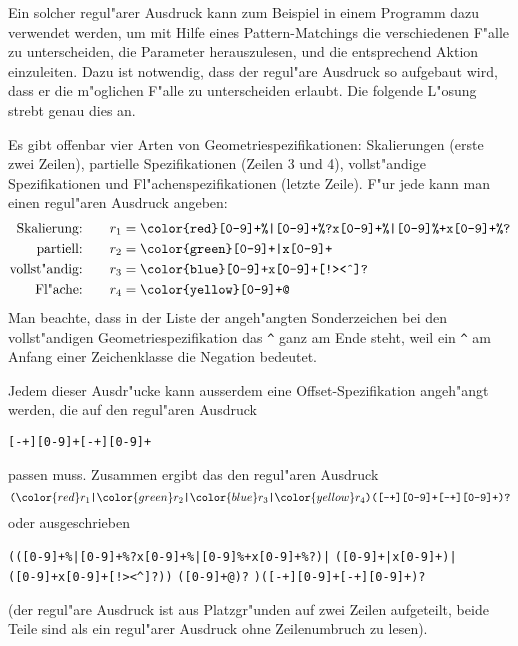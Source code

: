 \begin{loesung}
Ein solcher regul"arer Ausdruck kann zum Beispiel in einem Programm dazu
verwendet werden, um mit Hilfe eines Pattern-Matchings die verschiedenen
F"alle zu unterscheiden, die Parameter herauszulesen, und die entsprechend
Aktion einzuleiten.
Dazu ist notwendig, dass der regul"are Ausdruck so aufgebaut wird, dass
er die m"oglichen F"alle zu unterscheiden erlaubt.
Die folgende L"osung strebt genau dies an.

Es gibt offenbar vier Arten von Geometriespezifikationen: Skalierungen 
(erste zwei Zeilen),
partielle Spezifikationen (Zeilen 3 und 4), vollst"andige Spezifikationen
und Fl"achenspezifikationen (letzte Zeile).
F"ur jede kann man einen regul"aren Ausdruck angeben:
\begin{align*}
\text{Skalierung:}\qquad&r_1 = \texttt{\color{red}[0-9]+\%|[0-9]+\%?x[0-9]+\%|[0-9]\%+x[0-9]+\%?}
\\
\text{partiell:}\qquad&r_2 = \texttt{\color{green}[0-9]+|x[0-9]+}
\\
\text{vollst"andig:}\qquad&r_3 = \texttt{\color{blue}[0-9]+x[0-9]+[!><\^{}]?}
\\
\text{Fl"ache:}\qquad&r_4 = \texttt{\color{yellow}[0-9]+@}
\end{align*}
Man beachte, dass in der Liste der angeh"angten Sonderzeichen bei den
vollst"andigen Geometriespezifikation das \texttt{\^{}} ganz am Ende
steht, weil ein \texttt{\^{}} am Anfang einer Zeichenklasse die
Negation bedeutet.


Jedem dieser Ausdr"ucke kann ausserdem eine Offset-Spezifikation angeh"angt
werden, die auf den regul"aren Ausdruck
\begin{center}
\texttt{[-+][0-9]+[-+][0-9]+}
\end{center}
passen muss. Zusammen ergibt das den regul"aren Ausdruck
\[
\texttt{(}
{\color{red} r_1}
\texttt{|}
{\color{green} r_2}
\texttt{|}
{\color{blue} r_3}
\texttt{|}
{\color{yellow} r_4}
\texttt{)([-+][0-9]+[-+][0-9]+)?}
\]
oder ausgeschrieben
\begin{center}
\texttt{(({\color{red}[0-9]+\%|[0-9]+\%?x[0-9]+\%|[0-9]\%+x[0-9]+\%?})|}%
\texttt{({\color{green}[0-9]+|x[0-9]+})|}\\
\texttt{({\color{blue}[0-9]+x[0-9]+[{}!><\^{}]?}))}%
\texttt{({\color{yellow}[0-9]+@})?}%
\texttt{)([-+][0-9]+[-+][0-9]+)?}
\end{center}
(der regul"are Ausdruck ist aus Platzgr"unden auf zwei Zeilen aufgeteilt,
beide Teile sind als ein regul"arer Ausdruck ohne Zeilenumbruch zu lesen).


\end{loesung}
